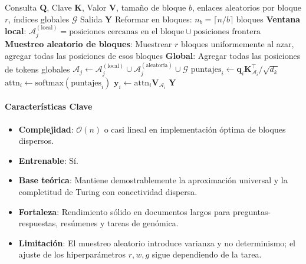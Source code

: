 \begin{algorithm}[H]
\caption{BigBird: Atención Dispersa por Bloques Aleatoria + Local + Global}
\begin{algorithmic}[1]
\Require Consulta $\mathbf{Q}$, Clave $\mathbf{K}$, Valor $\mathbf{V}$, tamaño de bloque $b$, enlaces aleatorios por bloque $r$, índices globales $\mathcal{G}$
\Ensure Salida $\mathbf{Y}$
\State Reformar en bloques: $n_b = \lceil n / b \rceil$ bloques
        \State \textbf{Ventana local}: $\mathcal{A}_j^{(\text{local})} = \text{posiciones cercanas en el bloque} \cup \text{posiciones frontera}$
        \State \textbf{Muestreo aleatorio de bloques}: Muestrear $r$ bloques uniformemente al azar, agregar todas las posiciones de esos bloques
        \State \textbf{Global}: Agregar todas las posiciones de tokens globales
        \State $\mathcal{A}_j \gets \mathcal{A}_j^{(\text{local})} \cup \mathcal{A}_j^{(\text{aleatoria})} \cup \mathcal{G}$
    \EndFor
\EndFor
{}
    \State $\text{puntajes}_i \gets \mathbf{q}_i \mathbf{K}_{\mathcal{A}_i}^\top / \sqrt{d_k}$
    \State $\text{attn}_i \gets \text{softmax}(\text{puntajes}_i)$
    \State $\mathbf{y}_i \gets \text{attn}_i \mathbf{V}_{\mathcal{A}_i}$
\EndFor
\Return $\mathbf{Y}$
\end{algorithmic}
\end{algorithm}

\paragraph{Características Clave}

\begin{itemize}[leftmargin=*]
    \item \textbf{Complejidad}: $\mathcal{O}(n)$ o casi lineal en implementación óptima de bloques dispersos.
    \item \textbf{Entrenable}: Sí.
    \item \textbf{Base teórica}: Mantiene demostrablemente la aproximación universal y la completitud de Turing con conectividad dispersa.
    \item \textbf{Fortaleza}: Rendimiento sólido en documentos largos para preguntas-respuestas, resúmenes y tareas de genómica.
    \item \textbf{Limitación}: El muestreo aleatorio introduce varianza y no determinismo; el ajuste de los hiperparámetros $r, w, g$ sigue dependiendo de la tarea.
\end{itemize}

